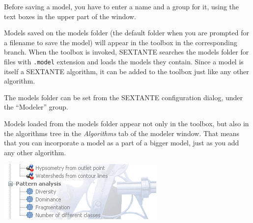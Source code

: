Before saving a model, you have to enter a name and a group for it, using the text boxes in the upper part of the window.

Models saved on the models folder (the default folder when you are prompted for a filename to save the model) will appear in the toolbox in the corresponding branch. When the toolbox is invoked, SEXTANTE searches the models folder for files with \texttt{.model} extension and loads the models they contain. Since a model is itself a SEXTANTE algorithm, it can be added to the toolbox just like any other algorithm.

The models folder can be set from the SEXTANTE configuration dialog, under the ``Modeler'' group.

Models loaded from the models folder appear not only in the toolbox, but also in the algorithms tree in the \emph{Algorithms} tab of the modeler window. That means that you can incorporate a model as a part of a bigger model, just as you add any other algorithm. 

\begin{center}
\includegraphics[width=.5\columnwidth]{models_icon.png}
\end{center}

